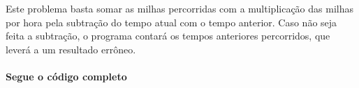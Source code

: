 \par Este problema basta somar as milhas percorridas com a multiplicação das milhas por hora pela subtração do tempo atual com o tempo anterior. Caso não seja feita a subtração, o programa contará os tempos anteriores percorridos, que leverá a um resultado errôneo.
\paragraph{Segue o código completo}
\begin{mdframed}[linewidth=0pt,backgroundcolor=codebgcolor]
    \inputminted[breaklines]{python}{../src/speedlimit/speedlimit.py}
\end{mdframed}